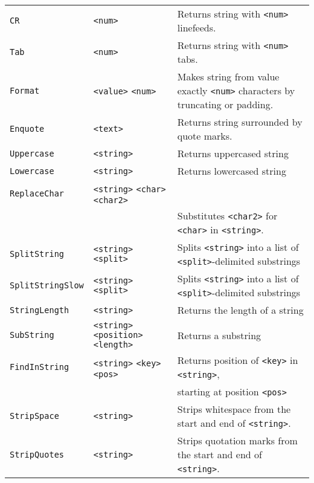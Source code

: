 \begin{longtable}{p{3cm}p{3cm}p{6cm}}
\verb+CR+ &\verb+<num>+ & Returns string with  \verb+<num>+ linefeeds.\\
\verb+Tab+ &\verb+<num>+ & Returns string with  \verb+<num>+ tabs.\\
\verb+Format+ &\verb+<value>+ \verb+<num>+ & Makes string from value
exactly \verb+<num>+ characters by truncating or padding.\\
\verb+Enquote+ &\verb+<text>+ & Returns string surrounded by quote marks.\\
\verb+Uppercase+ &\verb+<string>+ & Returns uppercased string\\ 
\verb+Lowercase+ &\verb+<string>+ & Returns lowercased string\\ 
\verb+ReplaceChar+&\verb+<string>+ \verb+<char>+ \verb+<char2>+\\
& & Substitutes  \verb+<char2>+ for \verb+<char>+ in \verb+<string>+.\\
\verb+SplitString+ &\verb+<string>+ \verb+<split>+ & Splits \verb+<string>+ into a list of \verb+<split>+-delimited substrings \\ 
\verb+SplitStringSlow+ &\verb+<string>+ \verb+<split>+ & Splits \verb+<string>+ into a list of \verb+<split>+-delimited substrings \\ 
\verb+StringLength+ &\verb+<string>+ & Returns the length of a string\\ 
\verb+SubString+ &\verb+<string>+ \verb+<position>+ \verb+<length>+& Returns a substring\\ 
\verb+FindInString+ &\verb+<string>+ \verb+<key>+ \verb+<pos>+ & Returns position
of \verb+<key>+ in \verb+<string>+,\\&& starting at position \verb+<pos>+\\ 
\verb+StripSpace+ &\verb+<string>+  & Strips whitespace from the start and end of \verb+<string>+.\\ 
\verb+StripQuotes+ &\verb+<string>+  & Strips quotation marks from the start and end of \verb+<string>+.\\ 


\end{longtable} 


